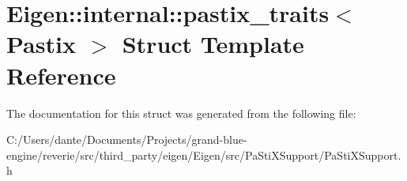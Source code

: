\hypertarget{struct_eigen_1_1internal_1_1pastix__traits}{}\section{Eigen\+::internal\+::pastix\+\_\+traits$<$ Pastix $>$ Struct Template Reference}
\label{struct_eigen_1_1internal_1_1pastix__traits}


The documentation for this struct was generated from the following file\+:\begin{DoxyCompactItemize}
\item 
C\+:/\+Users/dante/\+Documents/\+Projects/grand-\/blue-\/engine/reverie/src/third\+\_\+party/eigen/\+Eigen/src/\+Pa\+Sti\+X\+Support/Pa\+Sti\+X\+Support.\+h\end{DoxyCompactItemize}
